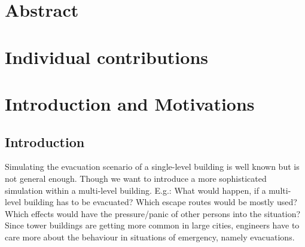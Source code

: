 \documentclass[11pt]{article}
\begin{document}






\tableofcontents

\newpage




\section{Abstract}


\section{Individual contributions}




\section{Introduction and Motivations}

\subsection{Introduction}

Simulating the evacuation scenario of a single-level building is well known but is not general enough. Though we want to introduce a more sophisticated simulation within a multi-level building. E.g.: What would happen, if a multi-level building has to be evacuated? Which escape routes would be mostly used? Which effects would have the pressure/panic of other persons into the situation? Since tower buildings are getting more common in large cities, engineers have to care more about the behaviour in situations of emergency, namely evacuations. 
\end{document}
